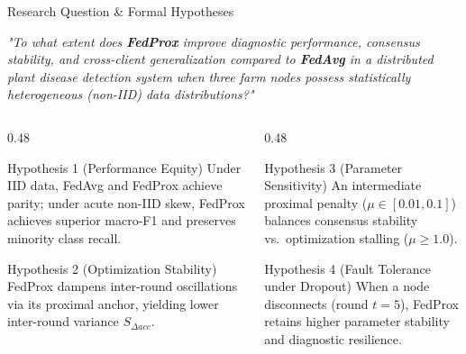 \documentclass[aspectratio=169]{beamer}
\begin{document}
\begin{frame}{Research Question \& Formal Hypotheses}
    \begin{center}
        \normalsize
        \textit{"To what extent does \textbf{FedProx} improve diagnostic performance, consensus stability, and cross-client generalization compared to \textbf{FedAvg} in a distributed plant disease detection system when three farm nodes possess statistically heterogeneous (non-IID) data distributions?"}
    \end{center}
    \vspace{0.15cm}
    \begin{columns}[T]
        \begin{column}{0.48\textwidth}
            \begin{block}{Hypothesis 1 (Performance Equity)}
                \footnotesize Under IID data, FedAvg and FedProx achieve parity; under acute non-IID skew, FedProx achieves superior macro-F1 and preserves minority class recall.
            \end{block}
            \begin{block}{Hypothesis 2 (Optimization Stability)}
                \footnotesize FedProx dampens inter-round oscillations via its proximal anchor, yielding lower inter-round variance $S_{\Delta acc}$.
            \end{block}
        \end{column}
        \begin{column}{0.48\textwidth}
            \begin{block}{Hypothesis 3 (Parameter Sensitivity)}
                \footnotesize An intermediate proximal penalty ($\mu \in [0.01, 0.1]$) balances consensus stability vs.\ optimization stalling ($\mu \ge 1.0$).
            \end{block}
            \begin{block}{Hypothesis 4 (Fault Tolerance under Dropout)}
                \footnotesize When a node disconnects (round $t=5$), FedProx retains higher parameter stability and diagnostic resilience.
            \end{block}
        \end{column}
    \end{columns}
\end{frame}
\end{document}
